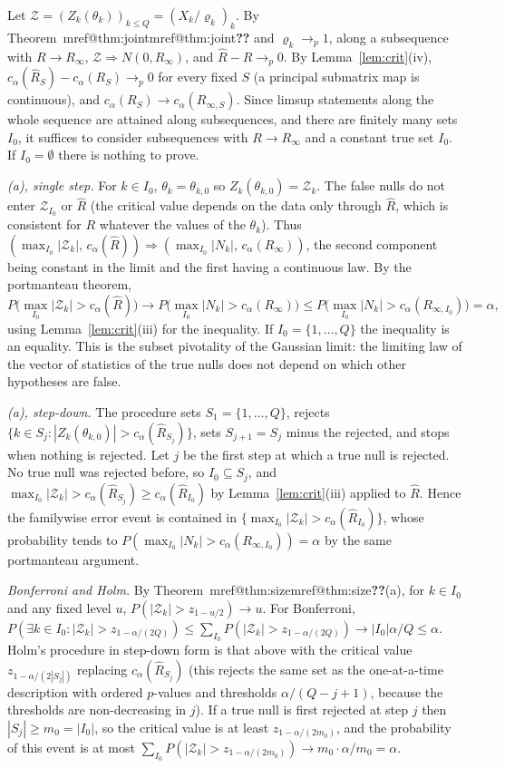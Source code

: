 \documentclass[pdflatex,sn-mathphys-num,iicol]{sn-jnl}
\makeatletter
\theoremstyle{thmstyleone}
\theoremstyle{thmstyletwo}
\theoremstyle{thmstylethree}
\newcommand{\Mref}[1]{\ifcsname mref@#1\endcsname\csname mref@#1\endcsname\else\textbf{??}\fi}
\makeatother
\begin{document}
Let $\mathcal Z=(Z_k(\theta_k))_{k\le Q}=(X_k/\varrho_k)_k$. By Theorem~\Mref{thm:joint} and $\varrho_k\to_p1$, along a subsequence with $R\to R_\infty$, $\mathcal Z\Rightarrow N(0,R_\infty)$, and $\hat R-R\to_p0$. By Lemma~\ref{lem:crit}(iv), $c_\alpha(\hat R_S)-c_\alpha(R_S)\to_p0$ for every fixed $S$ (a principal submatrix map is continuous), and $c_\alpha(R_S)\to c_\alpha(R_{\infty,S})$. Since limsup statements along the whole sequence are attained along subsequences, and there are finitely many sets $I_0$, it suffices to consider subsequences with $R\to R_\infty$ and a constant true set $I_0$. If $I_0=\emptyset$ there is nothing to prove.

\emph{(a), single step.} For $k\in I_0$, $\theta_k=\theta_{k,0}$ so $Z_k(\theta_{k,0})=\mathcal Z_k$. The false nulls do not enter $\mathcal Z_{I_0}$ or $\hat R$ (the critical value depends on the data only through $\hat R$, which is consistent for $R$ whatever the values of the $\theta_k$). Thus $(\max_{I_0}|\mathcal Z_k|,\,c_\alpha(\hat R))\Rightarrow(\max_{I_0}|N_k|,\,c_\alpha(R_\infty))$, the second component being constant in the limit and the first having a continuous law. By the portmanteau theorem,
\[
P\big(\max_{I_0}|\mathcal Z_k|>c_\alpha(\hat R)\big)\to P\big(\max_{I_0}|N_k|>c_\alpha(R_\infty)\big)\le P\big(\max_{I_0}|N_k|>c_\alpha(R_{\infty,I_0})\big)=\alpha,
\]
using Lemma~\ref{lem:crit}(iii) for the inequality. If $I_0=\{1,\dots,Q\}$ the inequality is an equality. This is the subset pivotality of the Gaussian limit: the limiting law of the vector of statistics of the true nulls does not depend on which other hypotheses are false.

\emph{(a), step-down.} The procedure sets $S_1=\{1,\dots,Q\}$, rejects $\{k\in S_j:|Z_k(\theta_{k,0})|>c_\alpha(\hat R_{S_j})\}$, sets $S_{j+1}=S_j$ minus the rejected, and stops when nothing is rejected. Let $j$ be the first step at which a true null is rejected. No true null was rejected before, so $I_0\subseteq S_j$, and $\max_{I_0}|\mathcal Z_k|>c_\alpha(\hat R_{S_j})\ge c_\alpha(\hat R_{I_0})$ by Lemma~\ref{lem:crit}(iii) applied to $\hat R$. Hence the familywise error event is contained in $\{\max_{I_0}|\mathcal Z_k|>c_\alpha(\hat R_{I_0})\}$, whose probability tends to $P(\max_{I_0}|N_k|>c_\alpha(R_{\infty,I_0}))=\alpha$ by the same portmanteau argument.

\emph{Bonferroni and Holm.} By Theorem~\Mref{thm:size}(a), for $k\in I_0$ and any fixed level $u$, $P(|\mathcal Z_k|>z_{1-u/2})\to u$. For Bonferroni, $P(\exists k\in I_0:|\mathcal Z_k|>z_{1-\alpha/(2Q)})\le\sum_{I_0}P(|\mathcal Z_k|>z_{1-\alpha/(2Q)})\to|I_0|\alpha/Q\le\alpha$. Holm's procedure in step-down form is that above with the critical value $z_{1-\alpha/(2|S_j|)}$ replacing $c_\alpha(\hat R_{S_j})$ (this rejects the same set as the one-at-a-time description with ordered $p$-values and thresholds $\alpha/(Q-j+1)$, because the thresholds are non-decreasing in $j$). If a true null is first rejected at step $j$ then $|S_j|\ge m_0=|I_0|$, so the critical value is at least $z_{1-\alpha/(2m_0)}$, and the probability of this event is at most $\sum_{I_0}P(|\mathcal Z_k|>z_{1-\alpha/(2m_0)})\to m_0\cdot\alpha/m_0=\alpha$.
\end{document}
